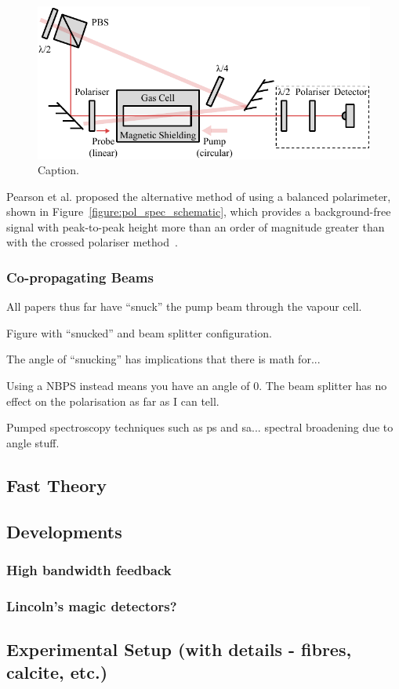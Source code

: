 \begin{figure}
\center
\includegraphics{part1/Figs/PolSpecWieman.pdf}
\caption{Caption.}
\label{figure:wieman_doppler-free_schematic}
\end{figure}

Pearson et al. proposed the alternative method of using a balanced polarimeter, shown in Figure~\ref{figure:pol_spec_schematic}, which provides a background-free signal with peak-to-peak height more than an order of magnitude greater than with the crossed polariser method~\cite{pearman_polarization_2002,yoshikawa_frequency_2003}.

\subsubsection{Co-propagating Beams}

All papers thus far have ``snuck'' the pump beam through the vapour cell.

Figure with ``snucked'' and beam splitter configuration.

The angle of ``snucking'' has implications that there is math for...

Using a NBPS instead means you have an angle of 0.
The beam splitter has no effect on the polarisation as far as I can tell.

Pumped spectroscopy techniques such as \gls{ps} and \gls{sa}... spectral broadening due to angle stuff.

\subsection{Fast Theory}

\subsection{Developments}

\subsubsection{High bandwidth feedback}


\subsubsection{Lincoln's magic detectors?}

\subsection{Experimental Setup (with details - fibres, calcite, etc.)}

